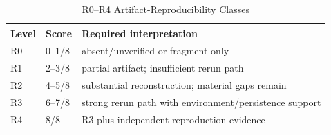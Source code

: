 \begin{table}[H]\centering\caption{R0--R4 Artifact-Reproducibility Classes}\label{tab:rclasses}\scriptsize\begin{tabularx}{\columnwidth}{p{}p{}Y}\toprule Level & Score & Required interpretation\\\midrule R0 & 0--1/8 & absent/unverified or fragment only\\ R1 & 2--3/8 & partial artifact; insufficient rerun path\\ R2 & 4--5/8 & substantial reconstruction; material gaps remain\\ R3 & 6--7/8 & strong rerun path with environment/persistence support\\ R4 & 8/8 & R3 plus independent reproduction evidence\\\bottomrule\end{tabularx}\end{table}